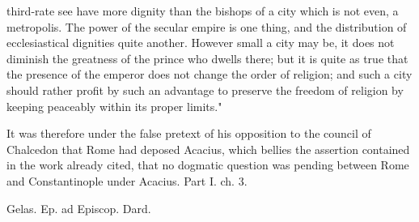 third-rate see have more dignity than the bishops of a city which is not even, a metropolis. The power of the secular empire is one thing, and the distribution of ecclesiastical dignities quite another. However small a city may be, it does not diminish the greatness of the prince who dwells there; but it is quite as true that the presence of the emperor does not change the order of religion; and such a city should rather profit by such an advantage to preserve the freedom of religion by keeping peaceably within its proper limits."

It was therefore under the false pretext of his opposition to the council of Chalcedon that Rome had deposed Acacius, which bellies the assertion contained in the work already cited, that no dogmatic question was pending between Rome and Constantinople under Acacius. Part I. ch. 3.

Gelas. Ep. ad Episcop. Dard.

